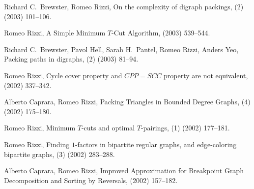 \begin{etaremune}
  \item {\sc Richard C.~Brewster, Romeo Rizzi},
   \newblock  On the complexity of digraph packings,
   (2) (2003) 101--106.

  \item {\sc Romeo Rizzi},
   \newblock  A Simple Minimum $T$-Cut Algorithm,
    (2003) 539--544.

  \item {\sc Richard C.~Brewster, Pavol Hell, Sarah H.~Pantel, Romeo Rizzi, Anders Yeo},
   \newblock  Packing paths in digraphs,
   (2) (2003) 81--94.

  \item {\sc Romeo Rizzi},
   \newblock  Cycle cover property and $CPP=SCC$ property are not equivalent,
    (2002) 337--342.

  \item {\sc Alberto Caprara, Romeo Rizzi},
   \newblock  Packing Triangles in Bounded Degree Graphs,
   (4) (2002) 175--180.

  \item {\sc Romeo Rizzi},
   \newblock  Minimum $T$-cuts and optimal $T$-pairings,
   (1) (2002) 177--181.

  \item {\sc Romeo Rizzi},
   \newblock  Finding $1$-factors in bipartite regular graphs,
              and edge-coloring bipartite graphs,
   (3) (2002) 283--288. 

  \item {\sc Alberto Caprara, Romeo Rizzi},
   \newblock  Improved Approximation for Breakpoint Graph Decomposition
              and Sorting by Reversals,
    (2002) 157--182.


\end{etaremune}
